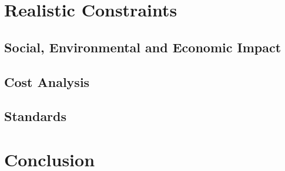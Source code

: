 
\section{Realistic Constraints}



\subsection{Social, Environmental and Economic Impact}

\subsection{Cost Analysis}

\subsection{Standards}



\section{Conclusion}




